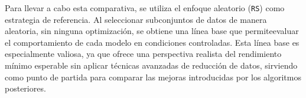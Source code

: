 Para llevar a cabo esta comparativa, se utiliza el enfoque aleatorio (\texttt{RS}) como estrategia de referencia.
Al seleccionar subconjuntos de datos de manera aleatoria, sin ninguna optimización, se obtiene una línea base que permiteevaluar el
comportamiento de cada modelo en condiciones controladas.
Esta línea base es especialmente valiosa, ya que ofrece una perspectiva realista del rendimiento mínimo esperable sin aplicar técnicas
avanzadas de reducción de datos, sirviendo como punto de partida para comparar las mejoras introducidas por los algoritmos posteriores.


\begin{table}[htp]
  \centering
\end{table}
